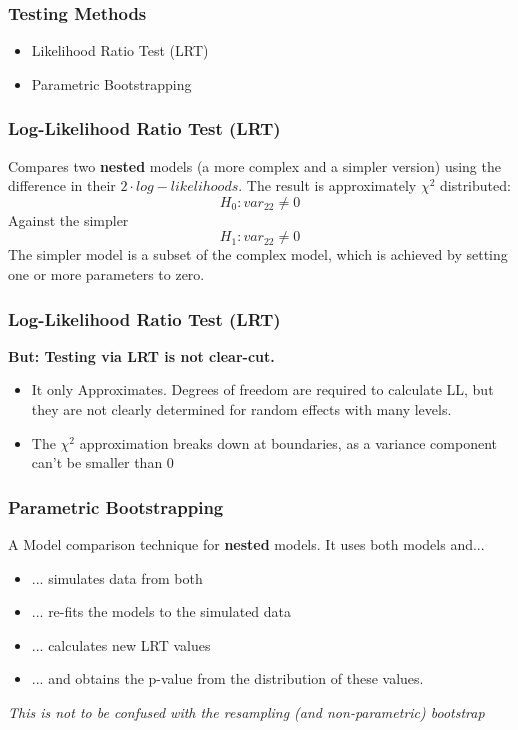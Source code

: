 \documentclass{beamer}
\begin{document}
\begin{frame}
    \frametitle{Testing Methods}
    \Large
    \begin{itemize}
        \item Likelihood Ratio Test (LRT)
        \item Parametric Bootstrapping
    \end{itemize}
\end{frame}

\begin{frame}
    \frametitle{Log-Likelihood Ratio Test (LRT)}
    Compares two \textbf{nested} models (a more complex and a simpler version) using the difference in their $2 \cdot log-likelihoods$. The result is approximately $\chi^2$ distributed:
    \[
    H_0: var_{22} \neq 0
    \]
    Against the simpler
    \[
    H_1: var_{22} \neq 0
    \]
    The simpler model is a subset of the complex model, which is achieved by setting one or more parameters to zero.
\end{frame}

\begin{frame}[fragile]
\frametitle{Log-Likelihood Ratio Test (LRT)}
\large
\textbf{But: Testing via LRT is not clear-cut.}
\begin{itemize}
    \item It only Approximates. Degrees of freedom are required to calculate LL, but they are not clearly determined for random effects with many levels.
    \item The $\chi^2$ approximation breaks down at boundaries, as a variance component can't be smaller than 0
\end{itemize}
\end{frame}

\begin{frame}
    \frametitle{Parametric Bootstrapping}
    \large
    A Model comparison technique for \textbf{nested} models. It uses both models and...
    \begin{itemize}
        \item ... simulates data from both
        \item ... re-fits the models to the simulated data
        \item ... calculates new LRT values 
        \item ... and obtains the p-value from the distribution of these values.
    \end{itemize}
    \vspace{0.2cm}

    \textit{This is not to be confused with the resampling (and non-parametric) bootstrap}
\end{frame}
\end{document}
